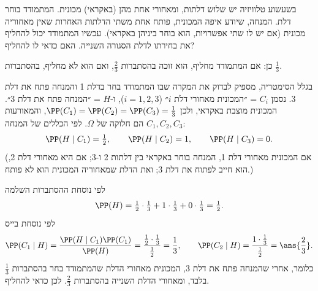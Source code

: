 בשעשוע טלוויזיה יש שלוש דלתות, ומאחורי אחת מהן (באקראי) מכונית. המתמודד בוחר דלת. המנחה, שיודע איפה המכונית, פותח אחת משתי הדלתות האחרות שאין מאחוריה מכונית (אם יש לו שתי אפשרויות, הוא בוחר ביניהן באקראי). עכשיו המתמודד יכול להחליף את בחירתו לדלת הסגורה השנייה. האם כדאי לו להחליף?
\begin{solbox}
כן: אם המתמודד מחליף, הוא זוכה בהסתברות $\frac23$, ואם הוא לא מחליף, בהסתברות $\frac13$.

בגלל הסימטריה, מספיק לבדוק את המקרה שבו המתמודד בחר בדלת 1 והמנחה פתח את דלת 3. נסמן $C_i$ = ״המכונית מאחורי דלת $i$״ ($i=1,2,3$), ו-$H$ = ״המנחה פתח את דלת 3״. המכונית מוצבת באקראי, ולכן $\PP(C_1)=\PP(C_2)=\PP(C_3)=\frac13$, והמאורעות $C_1,C_2,C_3$ הם חלוקה של $\Omega$. לפי הכללים של המנחה:
\[
\PP(H\mid C_1)=\tfrac12,\qquad \PP(H\mid C_2)=1,\qquad \PP(H\mid C_3)=0.
\]
(אם המכונית מאחורי דלת 1, המנחה בוחר באקראי בין דלתות 2 ו-3; אם היא מאחורי דלת 2, הוא חייב לפתוח את דלת 3; ואת הדלת שמאחוריה המכונית הוא לא פותח.)

לפי נוסחת ההסתברות השלמה
\[
\PP(H)=\tfrac12\cdot\tfrac13+1\cdot\tfrac13+0\cdot\tfrac13=\tfrac12.
\]
לפי נוסחת בייס
\[
\PP(C_1\mid H)=\frac{\PP(H\mid C_1)\PP(C_1)}{\PP(H)}=\frac{\frac12\cdot\frac13}{\frac12}=\frac13,\qquad
\PP(C_2\mid H)=\frac{1\cdot\frac13}{\frac12}=\ans{\frac23}.
\]
כלומר, אחרי שהמנחה פתח את דלת 3, המכונית מאחורי הדלת שהמתמודד בחר בהסתברות $\frac13$ בלבד, ומאחורי הדלת השנייה בהסתברות $\frac23$. לכן כדאי להחליף.
\end{solbox}
